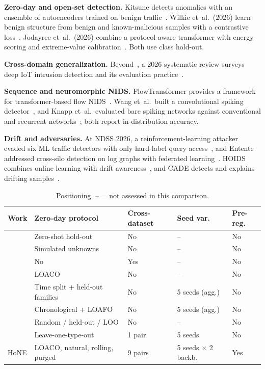 \documentclass[conference]{IEEEtran}
\begin{document}
\textbf{Zero-day and open-set detection.} Kitsune detects anomalies with an ensemble of autoencoders trained on benign traffic~\cite{mirsky2018}. Wilkie et~al.\ (2026) learn benign structure from benign and known-malicious samples with a contrastive loss~\cite{wilkie2026}. Jodayree et~al.\ (2026) combine a protocol-aware transformer with energy scoring and extreme-value calibration~\cite{jodayree2026}. Both use class hold-out.

\textbf{Cross-domain generalization.} Beyond~\cite{layeghy2023xdomain,layeghy2023dinids,martinez2026}, a 2026 systematic review surveys deep IoT intrusion detection and its evaluation practice~\cite{fernandez2026}.

\textbf{Sequence and neuromorphic NIDS.} FlowTransformer provides a framework for transformer-based flow NIDS~\cite{manocchio2024}. Wang et~al.\ built a convolutional spiking detector~\cite{wang2024snn}, and Knapp et~al.\ evaluated bare spiking networks against conventional and recurrent networks~\cite{knapp2025}; both report in-distribution accuracy.

\textbf{Drift and adversaries.} At NDSS 2026, a reinforcement-learning attacker evaded six ML traffic detectors with only hard-label query access~\cite{liu2026netmasq}, and Entente addressed cross-silo detection on log graphs with federated learning~\cite{xu2026entente}. HOIDS combines online learning with drift awareness~\cite{depaola2026}, and CADE detects and explains drifting samples~\cite{yang2021cade}.

\begin{table}[!t]
\centering\scriptsize\setlength{\tabcolsep}{2pt}
\caption{Positioning. -- = not assessed in this comparison.}
\label{tab:pos}
\begin{tabular}{lllll}
\toprule
Work & Zero-day protocol & Cross-dataset & Seed var. & Pre-reg.\\
\midrule
\cite{sarhan2023zeroshot} & Zero-shot hold-out & No & -- & No\\
\cite{zoppi2023} & Simulated unknowns & No & -- & No\\
\cite{layeghy2023xdomain} & No & Yes & -- & No\\
\cite{wilkie2026} & LOACO & No & -- & No\\
\cite{nayak2026} & Time split + held-out families & No & 5 seeds (agg.) & No\\
\cite{alhalangy2026} & Chronological + LOAFO & No & 5 seeds (agg.) & No\\
\cite{mesca2026} & Random / held-out / LOO & No & -- & No\\
\cite{jodayree2026} & Leave-one-type-out & 1 pair & 5 seeds & No\\
HoNE & LOACO, natural, rolling, purged & 9 pairs & 5 seeds $\times$ 2 backb. & Yes\\
\bottomrule
\end{tabular}
\end{table}
\end{document}
